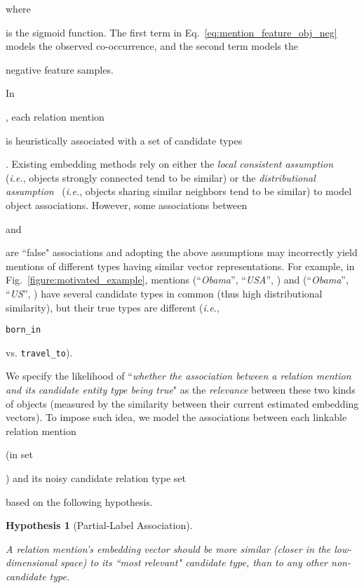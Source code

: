 \documentclass[letterpaper]{sig-alternate-2013}
\newtheorem{hypothesis}{Hypothesis}
\def\ie{{\sl i.e.}}
\begin{document}
where \begin{small}\end{small} is the sigmoid function. The first term in Eq.~\eqref{eq:mention_feature_obj_neg} models the observed co-occurrence, and the second term models the \begin{small}\end{small} negative feature samples.




In \begin{small}\end{small}, each relation mention \begin{small}\end{small} is heuristically associated with a set of candidate types \begin{small}\end{small}. 
Existing embedding methods rely on either the \textit{local consistent assumption}~\cite{he2004locality} (\ie, objects strongly connected tend to be similar) or the \textit{distributional assumption}~\cite{mikolov2013distributed} (\ie, objects sharing similar neighbors tend to be similar) to model object associations. However, some associations between \begin{small}\end{small} and \begin{small}\end{small} are ``false" associations and adopting the above assumptions may incorrectly yield mentions of different types having similar vector representations. For example, in Fig.~\ref{figure:motivated_example}, mentions (``\textit{Obama}'', ``\textit{USA}'', )  and (``\textit{Obama}'', ``\textit{US}'', ) have several candidate types in common (thus high distributional similarity), but their true types are different (\ie, \begin{small}\texttt{born\_in}\end{small} vs. \texttt{\small travel\_to}).


We specify the likelihood of ``\textit{whether the association between a relation mention and its candidate entity type being true}" as the \textit{relevance} between these two kinds of objects (measured by the similarity between their current estimated embedding vectors). To impose such idea, we model the associations between each linkable relation mention \begin{small}\end{small} (in set \begin{small}\end{small}) and its noisy candidate relation type set \begin{small}\end{small} based on the following hypothesis.
\begin{hypothesis}[Partial-Label Association]
\label{hypo:partial_label}

A relation mention's embedding vector should be more similar (closer in the low-dimensional space) to its ``most relevant" candidate type, than to any other non-candidate type.
\end{hypothesis}
\end{document}
